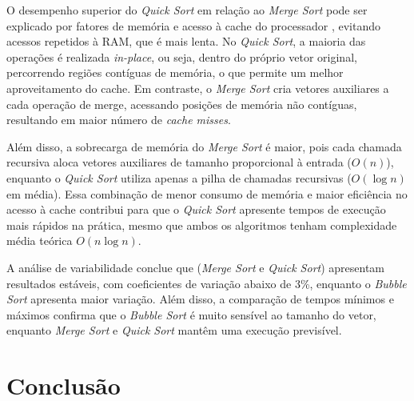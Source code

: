 \documentclass[12pt]{article}
\begin{document}
O desempenho superior do \textit{Quick Sort} em relação ao \textit{Merge Sort} pode ser explicado por fatores de memória e acesso à cache do processador \cite{prado:2005}, evitando acessos repetidos à RAM, que é mais lenta. No \textit{Quick Sort}, a maioria das operações é realizada \textit{in-place}, ou seja, dentro do próprio vetor original, percorrendo regiões contíguas de memória, o que permite um melhor aproveitamento do cache. Em contraste, o \textit{Merge Sort} cria vetores auxiliares a cada operação de merge, acessando posições de memória não contíguas, resultando em maior número de \textit{cache misses}.

Além disso, a sobrecarga de memória do \textit{Merge Sort} é maior, pois cada chamada recursiva aloca vetores auxiliares de tamanho proporcional à entrada ($O(n)$), enquanto o \textit{Quick Sort} utiliza apenas a pilha de chamadas recursivas ($O(\log n)$ em média). Essa combinação de menor consumo de memória e maior eficiência no acesso à cache contribui para que o \textit{Quick Sort} apresente tempos de execução mais rápidos na prática, mesmo que ambos os algoritmos tenham complexidade média teórica $O(n \log n)$.

A análise de variabilidade conclue que (\textit{Merge Sort} e \textit{Quick Sort}) apresentam resultados estáveis, com coeficientes de variação abaixo de 3\%, enquanto o \textit{Bubble Sort} apresenta maior variação. Além disso, a comparação de tempos mínimos e máximos confirma que o \textit{Bubble Sort} é muito sensível ao tamanho do vetor, enquanto \textit{Merge Sort} e \textit{Quick Sort} mantêm uma execução previsível.

\section{Conclusão}
\end{document}
